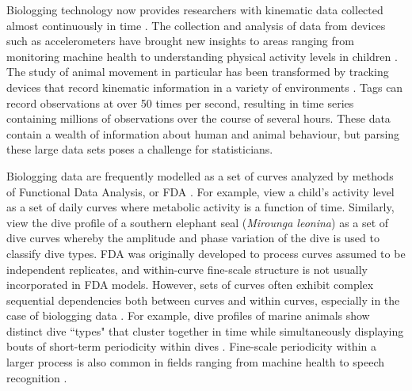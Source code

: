 
Biologging technology now provides researchers with kinematic data collected almost continuously in time \citep{Hooten:2017}.
The collection and analysis of data from devices such as accelerometers have brought new insights to areas ranging from monitoring machine health \citep{Getman:2009} to understanding physical activity levels in children \citep{Morris:2007}. The study of animal movement in particular has been transformed by tracking devices that record kinematic information in a variety of environments \citep{Borger:2020,Dot:2016b}. Tags can record observations at over 50 times per second, resulting in time series containing millions of observations over the course of several hours. These data contain a wealth of information about human and animal behaviour, but parsing these large data sets poses a challenge for statisticians.

Biologging data are frequently modelled as a set of curves analyzed by methods of Functional Data Analysis, or FDA \citep{Ramsay:2005}. For example, \citet{Morris:2007} view a child's activity level as a set of daily curves where metabolic activity is a function of time. Similarly, \citet{Fu:2017} view the dive profile of a southern elephant seal (\textit{Mirounga leonina}) as a set of dive curves whereby the amplitude and phase variation of the dive is used to classify dive types.
%
FDA was originally developed to process curves assumed to be independent replicates, and within-curve fine-scale structure is not usually incorporated in FDA models. However, sets of curves often exhibit complex sequential dependencies both between curves and within curves, especially in the case of biologging data \citep{Barajas:2017}.
For example, dive profiles of marine animals show distinct dive ``types" that cluster together in time \citep{Tennessen:2019b} while simultaneously displaying bouts of short-term periodicity within dives \citep{Adam:2019}. Fine-scale periodicity within a larger process is also common in fields ranging from machine health \citep{Xin:2018,Lucero:2019} to speech recognition \citep{Juang:1991}.

